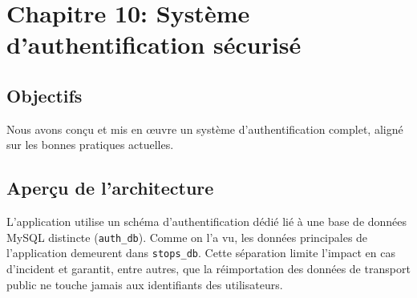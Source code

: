 \chapter{Chapitre 10: Système d'authentification sécurisé}\label{chap:auth}

\section{Objectifs}
Nous avons conçu et mis en œuvre un système d'authentification complet, aligné sur les bonnes pratiques actuelles.

\section{Aperçu de l'architecture}
L'application utilise un schéma d'authentification dédié lié à une base de données MySQL distincte (\texttt{auth\_db}). Comme on l'a vu, les données principales de l'application demeurent dans \texttt{stops\_db}. Cette séparation limite l'impact en cas d'incident et garantit, entre autres, que la réimportation des données de transport public ne touche jamais aux identifiants des utilisateurs.

